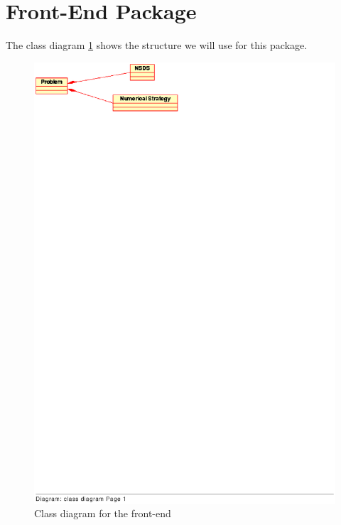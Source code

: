 \section{Front-End Package}

	The class diagram \ref{fig: Class diagram for the front-end} shows the structure we will use for this package.
	
	\begin{figure}
	\begin{center}
	\includegraphics[bb=25 720 300 830, clip]{figure/class_frontend.ps}%
	\caption{Class diagram for the front-end}
	\label{fig: Class diagram for the front-end}
	\end{center}
	\end{figure}
	



